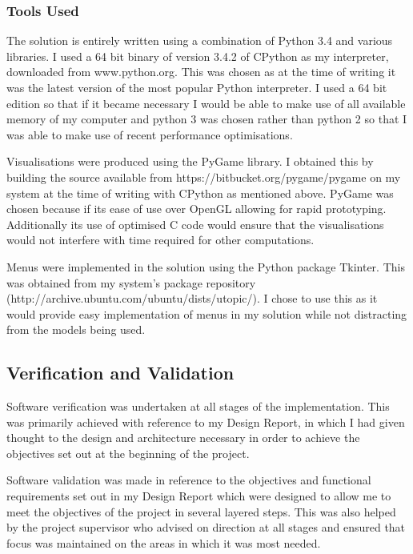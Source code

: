 \documentclass[12pt,a4paper]{article}
\begin{document}
\subsubsection{Tools Used}

The solution is entirely written using a combination of Python 3.4 and various libraries. I used a 64 bit binary of version 3.4.2 of CPython as my interpreter, downloaded from www.python.org. This was chosen as at the time of writing it was the latest version of the most popular Python interpreter. I used a 64 bit edition so that if it became necessary I would be able to make use of all available memory of my computer and python 3 was chosen rather than python 2 so that I was able to make use of recent performance optimisations.

Visualisations were produced using the PyGame library. I obtained this by building the source available from https://bitbucket.org/pygame/pygame on my system at the time of writing with CPython as mentioned above. PyGame was chosen because if its ease of use over OpenGL allowing for rapid prototyping. Additionally its use of optimised C code would ensure that the visualisations would not interfere with time required for other computations.

Menus were implemented in the solution using the Python package Tkinter. This was obtained from my system's package repository (http://archive.ubuntu.com/ubuntu/dists/utopic/). I chose to use this as it would provide easy implementation of menus in my solution while not distracting from the models being used.

\subsection{Verification and Validation}

Software verification was undertaken at all stages of the implementation. This was primarily achieved with reference to my Design Report, in which I had given thought to the design and architecture necessary in order to achieve the objectives set out at the beginning of the project.

Software validation was made in reference to the objectives and functional requirements set out in my Design Report which were designed to allow me to meet the objectives of the project in several layered steps. This was also helped by the project supervisor who advised on direction at all stages and ensured that focus was maintained on the areas in which it was most needed.
\end{document}
